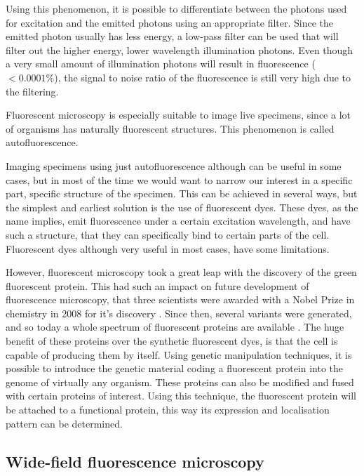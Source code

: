 \documentclass{tdk_style}
\begin{document}
Using this phenomenon, it is possible to differentiate between the photons used for excitation and the emitted photons using an appropriate filter. Since the emitted photon usually has less energy, a low-pass filter can be used that will filter out the higher energy, lower wavelength illumination photons. Even though a very small amount of illumination photons will result in fluorescence ($<0.0001\%$), the signal to noise ratio of the fluorescence is still very high due to the filtering.

Fluorescent microscopy is especially suitable to image live specimens, since a lot of organisms has naturally fluorescent structures. This phenomenon is called autofluorescence.

Imaging specimens using just autofluorescence although can be useful in some cases, but in most of the time we would want to narrow our interest in a specific part, specific structure of the specimen. This can be achieved in several ways, but the simplest and earliest solution is the use of fluorescent dyes. These dyes, as the name implies, emit fluorescence under a certain excitation wavelength, and have such a structure, that they can specifically bind to certain parts of the cell. Fluorescent dyes although very useful in most cases, have some limitations. 

However, fluorescent microscopy took a great leap with the discovery of the green fluorescent protein. This had such an impact on future development of fluorescence microscopy, that three scientists were awarded with a Nobel Prize in chemistry in 2008 for it's discovery \cite{service_three_2008}. Since then, several variants were generated, and so today a whole spectrum of fluorescent proteins are available \cite{shaner_guide_2005}. The huge benefit of these proteins over the synthetic fluorescent dyes, is that the cell is capable of producing them by itself. Using genetic manipulation techniques, it is possible to introduce the genetic material coding a fluorescent protein into the genome of virtually any organism. These proteins can also be modified and fused with certain proteins of interest. Using this technique, the fluorescent protein will be attached to a functional protein, this way its expression and localisation pattern can be determined.

\subsection{Wide-field fluorescence microscopy}
\end{document}
